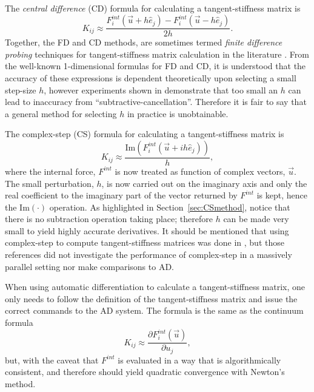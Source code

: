 \documentclass[preprint,12pt]{elsarticle}
\begin{document}
The \emph{central difference} (CD) formula for calculating a tangent-stiffness matrix is
%
\begin{equation} 
  K_{ij} \approx \frac{F_i^{int}(\vec{u} + h \hat{e}_j) - F_i^{int}(\vec{u} - h \hat{e}_j)}{2 h}.
\end{equation}
%
Together, the FD and CD methods, are sometimes termed \emph{finite difference probing} techniques for tangent-stiffness matrix calculation in the literature \cite{ref-Adaggio}. From the well-known 1-dimensional formulas for FD and CD, it is understood that the accuracy of these expressions is dependent theoretically upon selecting a small step-size $h$, however experiments shown in \cite{squire1998using} demonstrate that too small an $h$ can lead to inaccuracy from ``subtractive-cancellation''. Therefore it is fair to say that a general method for selecting $h$ in practice is unobtainable.

The complex-step (CS) formula for calculating a tangent-stiffness matrix is
%
\begin{equation} K_{ij} \approx \frac{\mbox{Im}(F_i^{int}(\vec{u} + i h
\hat{e}_j))}{h}, \end{equation}
%
where the internal force, $F^{int}$ is now treated as function of complex
vectors,  $\vec{u}$. The small perturbation, $h$, is now carried out on the
imaginary axis and only the real coefficient to the imaginary part of the
vector returned by $F^{int}$ is kept, hence the $\mbox{Im}(\cdot)$ operation.
As highlighted in Section~\ref{sec:CSmethod}, notice that there is no
subtraction operation taking place; therefore $h$ can be made very small to
yield highly accurate derivatives. It should be mentioned that using
complex-step to compute tangent-stiffness matrices was done in
\cite{perez2000numerical,perez2012numerical}, but those references did not
investigate the performance of complex-step in a massively parallel setting nor
make comparisons to AD. 

When using automatic differentiation to calculate a tangent-stiffness matrix,
one only needs to follow the definition of the tangent-stiffness matrix and
issue the correct commands to the AD system. The formula is the same as the
continuum formula
%
\begin{equation} K_{ij} \approx \frac{\partial F_i^{int}(\vec{u})}{\partial u_j},
\end{equation}
%
but, with the caveat that $F^{int}$ is evaluated in a way that is
algorithmically consistent, and therefore should yield quadratic convergence
with Newton's method.
\end{document}
